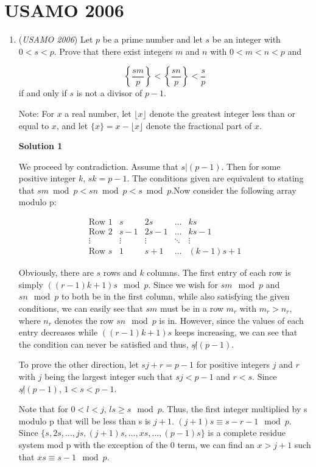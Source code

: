 \section{USAMO 2006}
        \begin{enumerate}
        	\item (\textit{USAMO 2006}) Let $p$ be a prime number and let $s$ be an integer with $0<s<p$. Prove that there exist integers $m$ and $n$ with $0<m<n<p$ and

 \[\left\lbrace\frac{sm}{p}\right\rbrace<\left\lbrace\frac{sn}{p}\right\rbrace<\frac{s}{p}\]
if and only if $s$ is not a divisor of $p-1$.


 Note: For $x$ a real number, let $\lfloor x\rfloor$ denote the greatest integer less than or equal to $x$, and let $\lbrace x\rbrace=x-\lfloor x\rfloor$ denote the fractional part of $x$.


 



\textbf{Solution 1}

We proceed by contradiction.  Assume that $s|(p-1)$.  Then for some positive integer $k$, $sk=p-1$.  The conditions given are equivalent to stating that $sm \bmod p < sn \bmod p< s\bmod p$.Now consider the following array modulo p:

 
 \[\begin{array}{ccccc} \mbox{Row 1}& s& 2s&\hdots& ks\\ \mbox{Row 2}& s-1& 2s-1& \hdots&ks-1\\ \vdots&\vdots&\vdots&\ddots&\vdots\\ \mbox{Row }s& 1& s+1& \hdots& (k-1)s+1 \end{array}\]

 Obviously, there are $s$ rows and $k$ columns. The first entry of each row is simply $((r-1)k+1)s\mod p$.  Since we wish for $sm\mod p$ and $sn\mod p$ to both be in the first column, while also satisfying the given conditions, we can easily see that $sm$ must be in a row $m_r$ with $m_r>n_r$, where $n_r$ denotes the row $sn \mod p$ is in.  However, since the values of each entry decreases while $((r-1)k+1)s$ keeps increasing, we can see that the condition can never be satisfied and thus, $s\not|(p-1).$

 To prove the other direction, let $sj+r=p-1$ for positive integers $j$ and $r$ with $j$ being the largest integer such that $sj<p-1$ and $r<s$. Since $s\not|(p-1)$, $1<s<p-1$.

 Note that for $0<l<j$, $ls\ge s\mod p$.  Thus, the first integer multiplied by s modulo p that will be less than s is $j+1.$ $(j+1)s\equiv s-r-1\mod p$.  Since $\lbrace s,2s,\hdots,js,(j+1)s,\hdots,xs,\hdots,(p-1)s \rbrace$ is a complete residue system mod p with the exception of the 0 term, we can find an $x>j+1$ such that $xs \equiv s-1 \mod p$.


\end{enumerate}
